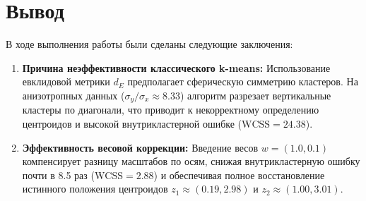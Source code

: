 \documentclass{bmstu-sob}
\begin{document}
	
	\section{Вывод}
	
	В ходе выполнения работы были сделаны следующие заключения:
	\begin{enumerate}
		\item \textbf{Причина неэффективности классического k-means:} Использование евклидовой метрики $d_E$ предполагает сферическую симметрию кластеров. На анизотропных данных ($\sigma_y / \sigma_x \approx 8.33$) алгоритм разрезает вертикальные кластеры по диагонали, что приводит к некорректному определению центроидов и высокой внутрикластерной ошибке ($\text{WCSS} = 24.38$).
		
		\item \textbf{Эффективность весовой коррекции:} Введение весов $w = (1.0, 0.1)$ компенсирует разницу масштабов по осям, снижая внутрикластерную ошибку почти в 8.5 раз ($\text{WCSS} = 2.88$) и обеспечивая полное восстановление истинного положения центроидов $z_1 \approx (0.19, 2.98)$ и $z_2 \approx (1.00, 3.01)$.
	\end{enumerate}
	
\end{document}
